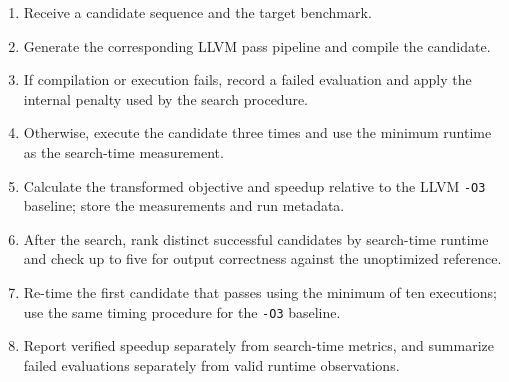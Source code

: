 \begin{algorithm}[t]
\caption{Candidate Evaluation and Final Verification}
\label{alg:eval}
\begin{enumerate}[leftmargin=*,itemsep=0pt,label=\arabic*)]
\item Receive a candidate sequence and the target benchmark.
\item Generate the corresponding LLVM pass pipeline and compile the candidate.
\item If compilation or execution fails, record a failed evaluation and apply the internal penalty used by the search procedure.
\item Otherwise, execute the candidate three times and use the minimum runtime as the search-time measurement.
\item Calculate the transformed objective and speedup relative to the LLVM \texttt{-O3} baseline; store the measurements and run metadata.
\item After the search, rank distinct successful candidates by search-time runtime and check up to five for output correctness against the unoptimized reference.
\item Re-time the first candidate that passes using the minimum of ten executions; use the same timing procedure for the \texttt{-O3} baseline.
\item Report verified speedup separately from search-time metrics, and summarize failed evaluations separately from valid runtime observations.
\end{enumerate}
\end{algorithm}
